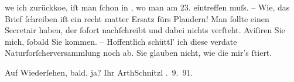                   we{\geminationn} ich zurückko{\geminationm}e, iſt
                  {\pb}man ſchon in \label{K_L02952-4v}\label{K_L02952-4}, wo man am 23. eintreffen muſs. – Wie, das
               Brief ſchreiben iſt ein recht matter Ersatz fürs Plaudern! Man ſollte einen Secretair
               haben, der ſofort nachſchreibt und dabei nichts verſteht. Aviſiren Sie mich, ſobald
               Sie kommen. – Hoffentlich schüttl’ ich diese verda{\geminationm}te
               Naturforſcherversammlung noch ab. Sie glauben nicht, wie die mir’s ſtiert.\pend
           
\pstart
           {\pb}Auf Wiederſehen, bald, ja?\pend
           \pstart Ihr \spacefill\mbox{ArthSchnitzl}\pend{}
. 9. 91.\pend
           \endnumbering{}  
      